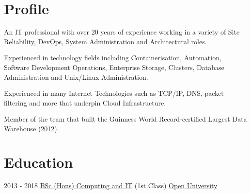 \documentclass[letterpaper]{tenseconds} %
\begin{document}
\makeprofile %

\section{Profile}
\textnormal{\faInfo} An IT professional with over 20 years of experience working in a variety of Site Reliability, DevOps, System Administration and Architectural roles.

\textnormal{\faInfo} Experienced in technology fields including Containerisation, Automation, Software Development Operations, Enterprise Storage, Clusters, Database Administration and Unix/Linux Administration.

\textnormal{\faInfo} Experienced in many Internet Technologies such as TCP/IP, DNS, packet filtering and more that underpin Cloud Infrastructure.

\textnormal{\textcolor{materialamber}{\faTrophy}} Member of the team that built the Guinness World Record-certified Largest Data Warehouse (2012).



\section{Education}
\begin{twenty} %
	\twentyitem
	{2013 - 2018}
	{}
	{\href{http://www.open.ac.uk/courses/computing-it/degrees/bsc-computing-it-q62}{BSc (Hons) Computing and IT} \textnormal{(1st Class)}}
	{\href{http://www.open.ac.uk}{Open University}}
	{}
	{}
\end{twenty}
\end{document}

